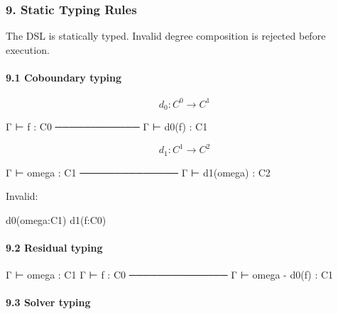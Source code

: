 \documentclass[
]{article}
\newenvironment{Shaded}{\begin{snugshade}}{\end{snugshade}}
\newcommand{\NormalTok}[1]{\textcolor[rgb]{0.12,0.11,0.11}{#1}}
\begin{document}
\subsubsection{9. Static Typing Rules}\label{static-typing-rules}

The DSL is statically typed. Invalid degree composition is rejected before execution.

\paragraph{9.1 Coboundary typing}\label{coboundary-typing}

\[
d_0 : C^0 \to C^1
\]

\begin{Shaded}
\begin{Highlighting}[]
\NormalTok{Γ ⊢ f : C0}
\NormalTok{────────────}
\NormalTok{Γ ⊢ d0(f) : C1}
\end{Highlighting}
\end{Shaded}

\[
d_1 : C^1 \to C^2
\]

\begin{Shaded}
\begin{Highlighting}[]
\NormalTok{Γ ⊢ omega : C1}
\NormalTok{──────────────}
\NormalTok{Γ ⊢ d1(omega) : C2}
\end{Highlighting}
\end{Shaded}

Invalid:

\begin{Shaded}
\begin{Highlighting}[]
\NormalTok{d0(omega:C1)}
\NormalTok{d1(f:C0)}
\end{Highlighting}
\end{Shaded}

\paragraph{9.2 Residual typing}\label{residual-typing}

\begin{Shaded}
\begin{Highlighting}[]
\NormalTok{Γ ⊢ omega : C1}
\NormalTok{Γ ⊢ f     : C0}
\NormalTok{──────────────}
\NormalTok{Γ ⊢ omega {-} d0(f) : C1}
\end{Highlighting}
\end{Shaded}

\paragraph{9.3 Solver typing}\label{solver-typing}
\end{document}
